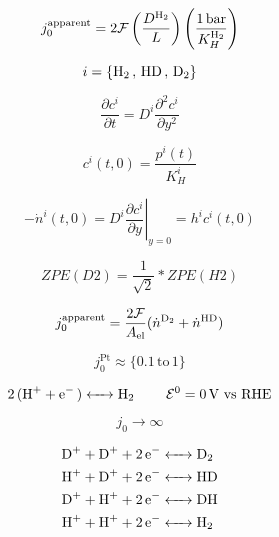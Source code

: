 \documentclass{article}
\begin{document}
	
	
	\begin{equation}
	j_0^{\text{apparent}} = 2\mathcal{F}\left(\frac{D^{\ce{H2}}}{L}\right)\left(\frac{1\,\text{bar}}{K_H^{\ce{H2}}}\right)
	\end{equation}
	
	\begin{equation}
	i = \left\{ \ce{H2}\,,\, \ce{HD}\,,\, \ce{D2} \right\}
	\end{equation}
	
	\begin{equation}
	\frac{\partial c^i}{\partial t} = D^i \frac{\partial^2 c^i}{\partial y^2}
	\end{equation}	
	
	\begin{equation}
	c^i(t,0) = \frac{p^i(t)}{K_H^i}
	\end{equation}
	
	\begin{equation}
	- \dot{n}^i(t,0) = D^i\left.\frac{\partial c^i}{\partial y}\right|_{y=0} = h^i c^i(t,0)
	\end{equation}
	
	\begin{equation}
	ZPE(D2) = \frac{1}{\sqrt{2}}*ZPE(H2) 
	\end{equation}
	
	\begin{equation}
	j_0^{\text{apparent}} = \frac{2 \mathcal{F}}{A_\text{el}} (\dot{n}^{\ce{D2}} + \dot{n}^{\ce{HD}}) 
	\end{equation}
	
	\begin{equation}
	j_0^{\text{Pt}} \approx \{0.1\, \text{to}\, 1\}
	\end{equation}
	
	
	\begin{equation}
	\ce{2 (H+ + e- ) <-> H2}\hspace{8mm}\mathcal{E}^0 = 0\, \text{V vs RHE}
	\end{equation}
	
	
	
	\begin{equation}
	j_0 \rightarrow \infty
	\end{equation}
	
	\begin{align}
	\ce{D+ + D+ + 2e- &<-> D2}\\
	\ce{H+ + D+ + 2e- &<-> HD}\\
	\ce{D+ + H+ + 2e- &<-> DH}\\
	\ce{H+ + H+ + 2e- &<-> H2}
	\end{align}
	
\end{document}
